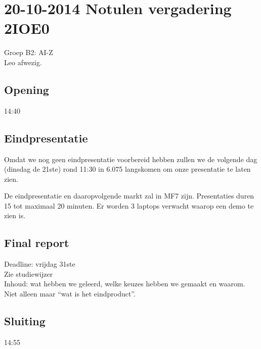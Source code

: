 \documentclass[a4paper,10pt]{article}
\begin{document}
\section*{20-10-2014 Notulen vergadering 2IOE0}
Groep B2: AI-Z\\
Leo afwezig.

\subsection*{Opening} 14:40

\subsection*{Eindpresentatie}
Omdat we nog geen eindpresentatie voorbereid hebben zullen we de volgende dag (dinsdag de 21ste) rond 11:30 in 6.075 langskomen om onze presentatie te laten zien.

De eindpresentatie en daaropvolgende markt zal in MF7 zijn. Presentaties duren 15 tot maximaal 20 minuten. Er worden 3 laptops verwacht waarop een demo te zien is.

\subsection*{Final report}
Deadline: vrijdag 31ste\\
Zie studiewijzer\\
Inhoud: wat hebben we geleerd, welke keuzes hebben we gemaakt en waarom. Niet alleen maar ``wat is het eindproduct''.

\subsection*{Sluiting} 14:55
\end{document}

